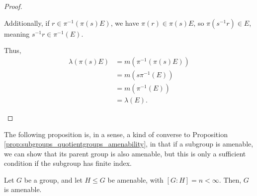 \documentclass[10pt]{mypackage2}
\begin{document}
\begin{proof}
\begin{enumerate}[(1)]
      Additionally, if $r\in \pi^{-1}\left(\pi(s)E\right)$, we have $\pi(r)\in \pi(s)E$, so $\pi\left(s^{-1}r\right)\in E$, meaning $s^{-1}r\in \pi^{-1}(E)$.\newline

      Thus,
      \begin{align*}
        \lambda\left(\pi\left(s\right)E\right) &= m\left(\pi^{-1}\left(\pi\left(s\right)E\right)\right)\\
                                               &= m\left(s\pi^{-1}\left(E\right)\right)\\
                                               &= m\left(\pi^{-1}\left(E\right)\right)\\
                                               &= \lambda\left(E\right).
      \end{align*}
  \end{enumerate}
\end{proof}
The following proposition is, in a sense, a kind of converse to Proposition \ref{prop:subgroups_quotientgroups_amenability}, in that if a subgroup is amenable, we can show that its parent group is also amenable, but this is only a sufficient condition if the subgroup has finite index.
\begin{proposition}\label{prop:finite_index_amenable_subgroup}
  Let $G$ be a group, and let $H\leq G$ be amenable, with $\left[G:H\right]  = n < \infty$. Then, $G$ is amenable.
\end{proposition}
\end{document}
